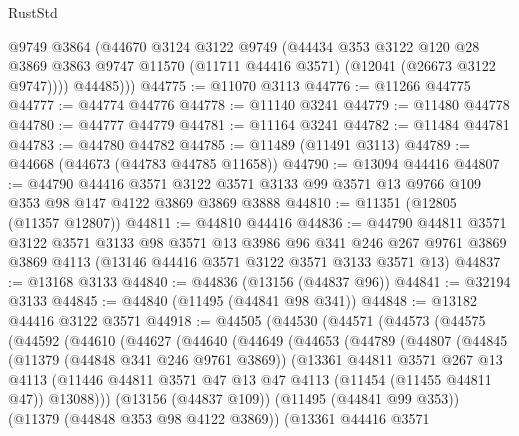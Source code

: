 \begin{lexlean}{RustStd}
\begin{coremodule}
          @9749
          @3864
          (@44670
            @3124
            @3122
            @9749
            (@44434
              @353
              @3122
              @120
              @28
              @3869
              @3863
              @9747
              @11570
              (@11711 @44416 @3571)
              (@12041 (@26673 @3122 @9747))))
          @44485)))
@44775 := @11070 @3113
@44776 := @11266 @44775
@44777 := @44774 @44776
@44778 := @11140 @3241
@44779 := @11480 @44778
@44780 := @44777 @44779
@44781 := @11164 @3241
@44782 := @11484 @44781
@44783 := @44780 @44782
@44785 := @11489 (@11491 @3113)
@44789 := @44668 (@44673 (@44783 @44785 @11658))
@44790 := @13094 @44416
@44807 := @44790
    @44416
    @3571
    @3122
    @3571
    @3133
    @99
    @3571
    @13
    @9766
    @109
    @353
    @98
    @147
    @4122
    @3869
    @3869
    @3888
@44810 := @11351 (@12805 (@11357 @12807))
@44811 := @44810 @44416
@44836 := @44790
    @44811
    @3571
    @3122
    @3571
    @3133
    @98
    @3571
    @13
    @3986
    @96
    @341
    @246
    @267
    @9761
    @3869
    @3869
    @4113
    (@13146 @44416 @3571 @3122 @3571 @3133 @3571 @13)
@44837 := @13168 @3133
@44840 := @44836 (@13156 (@44837 @96))
@44841 := @32194 @3133
@44845 := @44840 (@11495 (@44841 @98 @341))
@44848 := @13182 @44416 @3122 @3571
@44918 := @44505
    (@44530
      (@44571
        (@44573
          (@44575
            (@44592
              (@44610
                (@44627
                  (@44640
                    (@44649
                      (@44653
                        (@44789
                          (@44807
                            (@44845
                              (@11379 (@44848 @341 @246 @9761 @3869))
                              (@13361
                                @44811
                                @3571
                                @267
                                @13
                                @4113
                                (@11446
                                  @44811
                                  @3571
                                  @47
                                  @13
                                  @47
                                  @4113
                                  (@11454 (@11455 @44811 @47))
                                  @13088)))
                            (@13156 (@44837 @109))
                            (@11495 (@44841 @99 @353))
                            (@11379 (@44848 @353 @98 @4122 @3869))
                            (@13361
                              @44416
                              @3571

\end{coremodule}
\end{lexlean}

